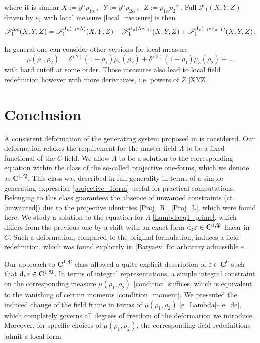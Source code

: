 \documentclass[12pt]{article}
\newcommand{\dr}{{{\rm d}}}
\begin{document}
where it is similar $X:=y^\alpha p_{1\alpha}\,,\;\; Y:=y^\alpha p_{2\alpha}\,,\;\; Z:=p_{1\alpha} p_2 {}^\alpha\,$. Full $\mathscr{F}_1(X,Y,Z)$ driven by $\varepsilon_1$ with local measure \eqref{local_measure} is then
\begin{equation}
\mathscr{F}^{loc}_1(X,Y,Z)=\mathscr{F}_1^{\dr_z(\varepsilon_1\ast\Lambda)}(X,Y,Z)-\mathscr{F}_1^{\dr_z(\Lambda\ast \varepsilon_1)}(X,Y,Z)+\mathscr{F}_1^{\dr_z(\varepsilon_1\ast\dr_z\varepsilon_1)}(X,Y,Z)\,.
\end{equation}

In general one can consider other versions for local measure
\begin{equation}
\mu(\rho_1,\rho_2)=\delta^{(2)}(1-\rho_1)\widetilde{\mu}_2(\rho_2)+\delta^{(3)}(1-\rho_1)\widetilde{\mu}_3(\rho_2)+\ldots
\end{equation}
with hard cutoff at some order. Those measures also lead to local field redefinition however with more derivatives, i.e. powers of $Z$ \eqref{XYZ}.
 
\section{Conclusion}\label{Conclusion}

A consistent deformation of the generating system proposed in \cite{Didenko:2022qga} is considered. Our deformation relaxes the requirement for the master-field $\Lambda$ to be a fixed functional of the 
$C$-field. We allow $\Lambda$ to be a solution to the corresponding equation within the class of the so-called projective one-forms, which we denote as 
$\mathbf{C}^{1,\mathfrak{P}}$. This class was described in full generality in terms of a simple generating expression \eqref{projective_1form} useful for practical computations. Belonging to this class guarantees the absence of unwanted constraints (cf. \eqref{unwanted}) due to the projective identities \eqref{Proj_R}, \eqref{Proj_L}, which were found here. We study a solution to the equation for $\Lambda$ \eqref{Lambdaeq1_prime}, which differs from the previous one by a shift with an exact form $\dr_z\varepsilon \in \mathbf{C}^{1,\mathfrak{P}}$ linear in $C$. Such a deformation, compared to the original formulation, induces a field redefinition, which was found explicitly in \eqref{Batyaev} for arbitrary admissible $\varepsilon$.

Our approach to $\mathbf{C}^{1,\mathfrak{P}}$ class allowed a quite explicit description of $\varepsilon\in\mathbf{C}^0$ such that $\dr_z \varepsilon\in \mathbf{C}^{1,\mathfrak{P}}$. In terms of integral representations, a simple integral constraint on the corresponding measure $\mu(\rho_1,\rho_2)$ \eqref{condition} suffices, which is equivalent to the vanishing of certain moments \eqref{condition_moment}. We presented the induced change of the field frame in terms of $\mu(\rho_1,\rho_2)$ \eqref{e_Lambda}--\eqref{e_de}, which completely governs all degrees of freedom of the deformation we introduce. Moreover, for specific choices of  $\mu(\rho_1,\rho_2)$, the corresponding field redefinitions admit a local form.
 
\end{document}
